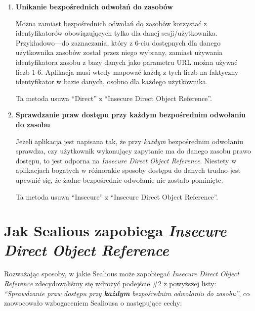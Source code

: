 \documentclass[12pt,polish,a4paper,]{report}
\begin{document}
\begin{enumerate}
\def\labelenumi{\arabic{enumi}.}
\item
  \textbf{Unikanie bezpośrednich odwołań do zasobów}

  Można zamiast bezpośrednich odwołań do zasobów korzystać z
  identyfikatorów obowiązujących tylko dla danej sesji/użytkownika.
  Przykładowo---do zaznaczania, który z 6-ciu dostępnych dla danego
  użytkownika zasobów został przez niego wybrany, zamiast używania
  identyfikatora zasobu z bazy danych jako parametru URL można używać
  liczb 1-6. Aplikacja musi wtedy mapować każdą z tych liczb na
  faktyczny identyfikator w bazie danych, osobno dla każdego
  użytkownika.

  Ta metoda usuwa ``Direct'' z ``Insecure Direct Object Reference''.
\item
  \textbf{Sprawdzanie praw dostępu przy każdym bezpośrednim odwołaniu do
  zasobu}

  Jeżeli aplikacja jest napisana tak, że przy \emph{każdym} bezpośrednim
  odwołaniu sprawdza, czy użytkownik wykonujący zapytanie ma do danego
  zasobu prawo dostępu, to jest odporna na \emph{Insecure Direct Object
  Reference}. Niestety w aplikacjach bogatych w różnorakie sposoby
  dostępu do danych trudno jest upewnić się, że żadne bezpośrednie
  odwołanie nie zostało pominięte.

  Ta metoda usuwa ``Insecure'' z ``Insecure Direct Object Reference''.
\end{enumerate}

\section{\texorpdfstring{Jak Sealious zapobiega \emph{Insecure Direct
Object
Reference}}{Jak Sealious zapobiega Insecure Direct Object Reference}}\label{jak-sealious-zapobiega-insecure-direct-object-reference}

Rozważając sposoby, w jakie Sealious może zapobiegać \emph{Insecure
Direct Object Reference} zdecydowaliśmy się wdrożyć podejście \#2 z
powyższej listy: \emph{``Sprawdzanie praw dostępu przy \textbf{każdym}
bezpośrednim odwołaniu do zasobu''}, co zaowocowało wzbogaceniem
Sealiousa o następujące cechy:
\end{document}
